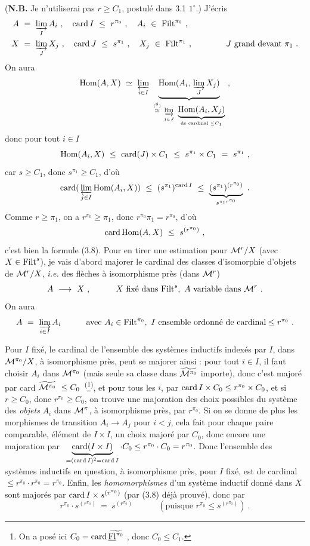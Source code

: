 (\textbf{N.B.} Je n'utiliserai pas $r\geq C_1$, postulé dans 3.1 $1^\circ$.) J'écris
\[
\begin{aligned}
A\ &=\ \varinjlim_I A_i\ ,\quad \operatorname{card} I\ \leq\ r^{\pi_0}\ ,\quad A_i\ \in\ \mathrm{Filt}^{\pi_0}\ ,\\
X\ &=\ \varinjlim_J X_j\ ,\quad \operatorname{card} J\ \leq\ s^{\pi_1}\ ,\quad X_j\ \in\ \mathrm{Filt}^{\pi_1}\ ,\qquad\qquad J\text{ grand devant }\pi_1\ .
\end{aligned}
\]
On aura
\[
\Hom(A,X)\ \simeq\ \varprojlim_{i\in I}\ \underbrace{\Hom(A_i,\,\varinjlim_J X_j)}_{\overset{(\text{\footnotemark[6]})}{\simeq}\ \varinjlim\limits_{j\in J}\ \underbrace{\Hom(A_i,X_j)}_{\text{de cardinal }\leq C_1}}\ ,
\]
donc pour tout $i\in I$
\[
\operatorname{Hom}(A_i,X)\ \leq\ \operatorname{card}(J)\times C_1\ \leq\ s^{\pi_1}\times C_1\ =\ s^{\pi_1}\ ,
\]
car $s\geq C_1$, donc $s^{\pi_1}\geq C_1$, d'où
\[
\card(\,\varprojlim_{j\in I}\Hom(A_i,X))\ \leq\ (s^{\pi_1})^{\card I}\ \leq\ \underbrace{(s^{\pi_1})^{(r^{\pi_0})}}_{s^{\pi_1 r^{\pi_0}}}\ . %
\]
Comme $r\geq\pi_1$, on a $r^{\pi_0}\geq\pi_1$, donc $r^{\pi_0}\pi_1=r^{\pi_0}$, d'où
\[
\operatorname{card}\operatorname{Hom}(A,X)\ \leq\ s^{(r^{\pi_0})}\ ,
\]
c'est bien la formule (3.8). Pour en tirer une estimation pour $\mathcal{M}^r/X$ (avec $X\in\mathrm{Filt}^s$),  je vais d'abord majorer le cardinal des classes d'isomorphie d'objets de $\mathcal{M}^r/X$, \textit{i.e.} des flèches à isomorphisme près (dans $\mathcal{M}^r$)
\[
A\ \longrightarrow\ X\ ,\qquad\quad X\text{ fixé dans }\mathrm{Filt}^s,\ A\text{ variable dans }\mathcal{M}^r\ .
\]
On aura
\[
A\ =\ \varinjlim_{i\in I} A_i\qquad\quad\text{avec } A_i\in\mathrm{Filt}^{\pi_0},\ I\text{ ensemble ordonné de cardinal}\leq r^{\pi_0}\ .
\]

Pour $I$ fixé, le cardinal de l'ensemble des systèmes inductifs indexés par $I$, dans $\mathcal{M}^{\pi_0}/X$, à isomorphisme près, peut se majorer ainsi : pour tout $i\in I$, il faut choisir $A_i$ dans $\mathcal{M}^{\pi_0}$ (mais seule sa classe dans $\widetilde{\mathcal{M}^{\pi_0}}$ importe), donc c'est majoré par card $\widetilde{\mathcal{M}^{\pi_0}}\ \leq C_0$~\textsuperscript{(}\footnote[7]{On a posé ici $C_0=\operatorname{card}\widetilde{\underline{\mathrm{Fl}}^{\pi_0}}$ , donc $C_0\leq C_1$.}\textsuperscript{)}, et pour tous les $i$, par $\operatorname{card} I\times C_0\leq r^{\pi_0}\times C_0$, et si $r\geq C_0$, donc $r^{\pi_0}\geq C_0$, on trouve une majoration des choix possibles du système des \textit{objets} $A_i$ dans $\mathcal{M}^\pi$, à isomorphisme près, par $r^{\pi_0}$. Si on se donne de plus les morphismes de transition $A_i\longrightarrow A_j$ pour $i<j$, cela fait pour chaque paire comparable, élément de $I\times I$, un choix majoré par $C_0$, donc encore une majoration par $\ \underbrace{\operatorname{card}(I\times I)}_{=(\operatorname{card} I)^2=\operatorname{card} I}\cdot C_0\leq r^{\pi_0}\cdot C_0=r^{\pi_0}$. Donc l'ensemble des systèmes inductifs en question, à isomorphisme près, pour $I$ fixé, est de cardinal $\leq r^{\pi_0}\cdot r^{\pi_0}=r^{\pi_0}$. Enfin, les \textit{homomorphismes} d'un système inductif donné dans $X$ sont majorés par $\operatorname{card} I\times s^{(r^{\pi_0})}$ (par (3.8) déjà prouvé), donc par
\[
r^{\pi_0}\cdot s^{(r^{\pi_0})}\ =\ s^{(r^{\pi_0})}\qquad\quad(\text{puisque } r^{\pi_0}\leq s^{(r^{\pi_0})})\ .
\]

